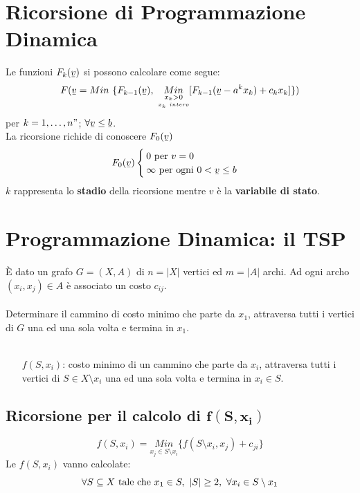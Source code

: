\section{Ricorsione di Programmazione Dinamica}
Le funzioni $F_{k}(\ubar{v})$ si possono calcolare come segue:
\begin{equation}
	F(\ubar{v}=Min\ \{F_{k-1}(\ubar{v}),\ \underset{\underset{x_{k}\ intero}{x_{k}>0}}{Min}[F_{k-1}(\ubar{v}-a^{k}x_{k})+c_{k}x_{k}]\})
\end{equation}
per $k=1,\dots,n"$; $\forall \ubar{v}\le \ubar{b}$.\\
La ricorsione richide di conoscere $F_{0}(\ubar{v})$
\begin{equation}
	F_{0}(\ubar{v})
	\begin{cases}
		0 \textnormal{ per }v={0}\\
		\infty \textnormal{ per ogni } 0 < \ubar{v}\le b
	\end{cases}
\end{equation}
$k$ rappresenta lo \textbf{stadio} della ricorsione mentre $v$ è la \textbf{variabile di stato}.

\section{Programmazione Dinamica: il TSP}
È dato un grafo $G=(X,A)$ di $n=|X|$ vertici ed $m=|A|$ archi. Ad ogni archo $(x_{i},x_{j})\in A$ è associato un costo $c_{ij}$.\\\\
Determinare il cammino di costo minimo che parte da $x_{1}$, attraversa tutti i vertici di $G$ una ed una sola volta e termina in $x_{1}$.\\\\
\begin{itemize}
	\item[$f(S,x_{i})$:] costo minimo di un cammino che parte da $x_{i}$, attraversa tutti i vertici di $S\in X\setminus{x_{i}}$ una ed una sola volta e termina in $x_{i}\in S$.
\end{itemize}

\subsection{Ricorsione per il calcolo di $\boldsymbol{f(S,x_{i})}$}
\begin{equation}
	f(S,x_{i})=\underset{x_{j}\in S\setminus{x_{i}}}{Min}\{f(S\setminus{x_{i}},x_{j})+c_{ji}\}
\end{equation}
Le $f(S,x_{i})$ vanno calcolate:
\begin{equation}
	\forall S\subseteq X \textnormal{ tale che }x_{1}\in S,\ |S|\ge 2,\ \forall x_{i}\in S\setminus{x_{1}}
\end{equation}

